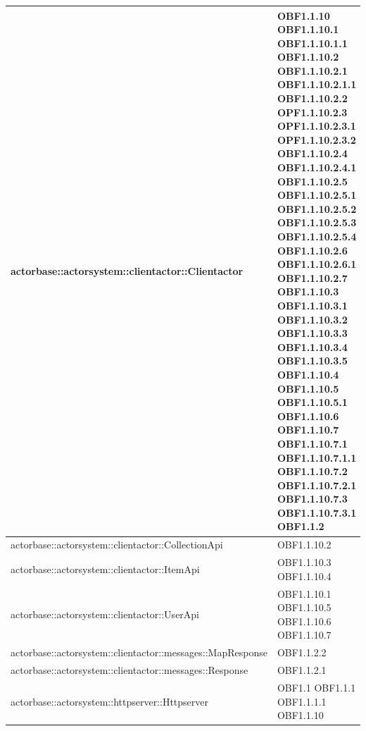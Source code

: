 \documentclass{scalatekids-article}
\begin{document}
\begin{longtable}[H]{|p{11.5cm}|p{5.5cm}|}
\hline
actorbase::actorsystem::clientactor::Clientactor & \multiLineCell[t]{OBF1.1.10 OBF1.1.10.1\\OBF1.1.10.1.1 OBF1.1.10.2\\OBF1.1.10.2.1 OBF1.1.10.2.1.1\\OBF1.1.10.2.2 OPF1.1.10.2.3\\OPF1.1.10.2.3.1 OPF1.1.10.2.3.2\\OBF1.1.10.2.4 OBF1.1.10.2.4.1\\OBF1.1.10.2.5 OBF1.1.10.2.5.1\\OBF1.1.10.2.5.2 OBF1.1.10.2.5.3\\OBF1.1.10.2.5.4 OBF1.1.10.2.6\\OBF1.1.10.2.6.1 OBF1.1.10.2.7\\OBF1.1.10.3 OBF1.1.10.3.1\\OBF1.1.10.3.2 OBF1.1.10.3.3\\OBF1.1.10.3.4 OBF1.1.10.3.5\\OBF1.1.10.4 OBF1.1.10.5\\OBF1.1.10.5.1 OBF1.1.10.6\\OBF1.1.10.7 OBF1.1.10.7.1\\OBF1.1.10.7.1.1 OBF1.1.10.7.2\\OBF1.1.10.7.2.1 OBF1.1.10.7.3\\OBF1.1.10.7.3.1 OBF1.1.2\\}\\
\hline
actorbase::actorsystem::clientactor::CollectionApi & \multiLineCell[t]{OBF1.1.10.2\\}\\
\hline
actorbase::actorsystem::clientactor::ItemApi & \multiLineCell[t]{OBF1.1.10.3 OBF1.1.10.4\\}\\
\hline
actorbase::actorsystem::clientactor::UserApi & \multiLineCell[t]{OBF1.1.10.1 OBF1.1.10.5\\OBF1.1.10.6 OBF1.1.10.7\\}\\
\hline
actorbase::actorsystem::clientactor::messages::MapResponse & \multiLineCell[t]{OBF1.1.2.2\\}\\
\hline
actorbase::actorsystem::clientactor::messages::Response & \multiLineCell[t]{OBF1.1.2.1\\}\\
\hline
actorbase::actorsystem::httpserver::Httpserver & \multiLineCell[t]{OBF1.1 OBF1.1.1\\OBF1.1.1.1 OBF1.1.10\\}\\

\end{longtable}
\end{document}

